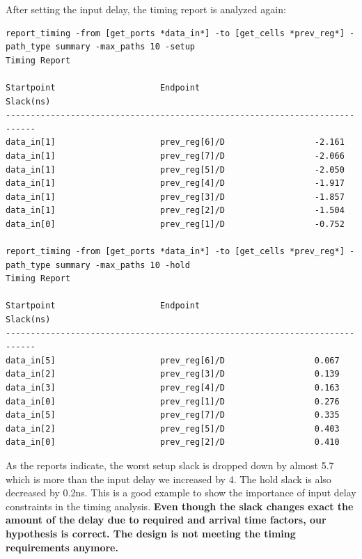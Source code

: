 \documentclass{report}
\begin{document}
After setting the input delay, the timing report is analyzed again:
\begin{verbatim}
report_timing -from [get_ports *data_in*] -to [get_cells *prev_reg*] -path_type summary -max_paths 10 -setup
Timing Report

Startpoint                     Endpoint                       Slack(ns)     
----------------------------------------------------------------------------
data_in[1]                     prev_reg[6]/D                  -2.161        
data_in[1]                     prev_reg[7]/D                  -2.066        
data_in[1]                     prev_reg[5]/D                  -2.050        
data_in[1]                     prev_reg[4]/D                  -1.917        
data_in[1]                     prev_reg[3]/D                  -1.857        
data_in[1]                     prev_reg[2]/D                  -1.504        
data_in[0]                     prev_reg[1]/D                  -0.752

report_timing -from [get_ports *data_in*] -to [get_cells *prev_reg*] -path_type summary -max_paths 10 -hold
Timing Report

Startpoint                     Endpoint                       Slack(ns)     
----------------------------------------------------------------------------
data_in[5]                     prev_reg[6]/D                  0.067         
data_in[2]                     prev_reg[3]/D                  0.139         
data_in[3]                     prev_reg[4]/D                  0.163         
data_in[0]                     prev_reg[1]/D                  0.276         
data_in[5]                     prev_reg[7]/D                  0.335         
data_in[2]                     prev_reg[5]/D                  0.403         
data_in[0]                     prev_reg[2]/D                  0.410
\end{verbatim}
As the reports indicate, the worst setup slack is dropped down by almost 5.7 which is more than the input delay we increased by 4. The hold slack is also decreased by 0.2ns. This is a good example to show the importance of input delay constraints in the timing analysis.
\textbf{Even though the slack changes exact the amount of the delay due to required and arrival time factors, our hypothesis is correct. The design is not meeting the timing requirements anymore.}
\end{document}
